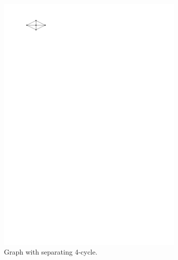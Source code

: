   \begin{figure}
    \centering
      \begin{subfigure}[b]{3cm}
        \centering
        \includegraphics[scale=1]{introduction/img/areaunivGraph.pdf}
        \caption{Graph with separating 4-cycle.}
      \end{subfigure}
      ~
      \begin{subfigure}[b]{3cm}
        \centering

\end{subfigure}
\end{figure}
